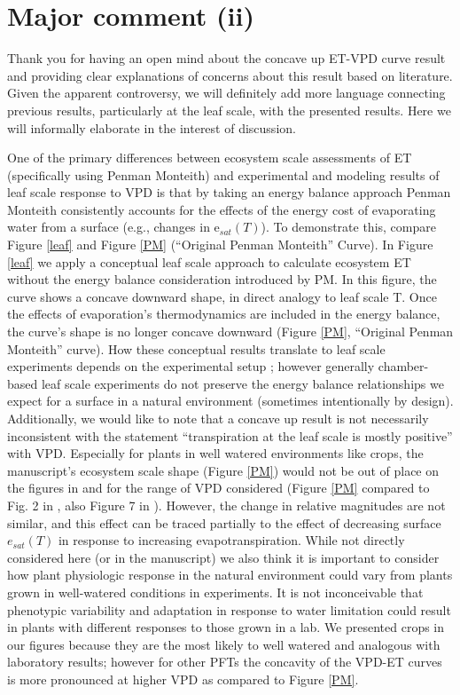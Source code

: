 \documentclass[12pt]{article}
\begin{document}
\section{Major comment (ii)}
\label{ii}

Thank you for having an open mind about the concave up ET-VPD curve
result and providing clear explanations of concerns about this result
based on literature. Given the apparent controversy, we will
definitely add more language connecting previous results, particularly
at the leaf scale, with the presented results. Here we will informally
elaborate in the interest of discussion.

One of the primary differences between ecosystem scale assessments of
ET (specifically using Penman Monteith) and experimental and modeling
results of leaf scale response to VPD is that by taking an energy
balance approach Penman Monteith consistently accounts for the effects
of the energy cost of evaporating water from a surface (e.g., changes
in e$_{sat}(T)$). To demonstrate this, compare Figure \ref{leaf} and
Figure \ref{PM} (``Original Penman Monteith'' Curve). In Figure
\ref{leaf} we apply a conceptual leaf scale approach to calculate
ecosystem ET without the energy balance consideration introduced by
PM. In this figure, the curve shows a concave downward shape, in
direct analogy to leaf scale T. Once the effects of evaporation's
thermodynamics are included in the energy balance, the curve's shape
is no longer concave downward (Figure \ref{PM}, ``Original Penman
Monteith'' curve). How these conceptual results translate to leaf
scale experiments depends on the experimental setup
\citep[e.g.,][]{Rawson1977, Turner1984, Mott2013}; however generally
chamber-based leaf scale experiments do not preserve the energy
balance relationships we expect for a surface in a natural environment
(sometimes intentionally by design). Additionally, we would like to
note that a concave up result is not necessarily inconsistent with the
statement ``transpiration at the leaf scale is mostly positive'' with
VPD. Especially for plants in well watered environments like crops,
the manuscript's ecosystem scale shape (Figure \ref{PM}) would not be
out of place on the figures in \cite{Rawson1977} and \cite{Mott2007}
for the range of VPD considered (Figure \ref{PM} compared to Fig. 2 in
\cite{Rawson1977}, also Figure 7 in \cite{Mott2007}). However, the
change in relative magnitudes are not similar, and this effect can be
traced partially to the effect of decreasing surface $e_{sat}(T)$ in
response to increasing evapotranspiration. While not directly
considered here (or in the manuscript) we also think it is important
to consider how plant physiologic response in the natural environment
could vary from plants grown in well-watered conditions in
experiments. It is not inconceivable that phenotypic variability and
adaptation in response to water limitation could result in plants with
different responses to those grown in a lab. We presented crops in our
figures because they are the most likely to well watered and analogous
with laboratory results; however for other PFTs the concavity of the
VPD-ET curves is more pronounced at higher VPD as compared to Figure
\ref{PM}.
\end{document}
